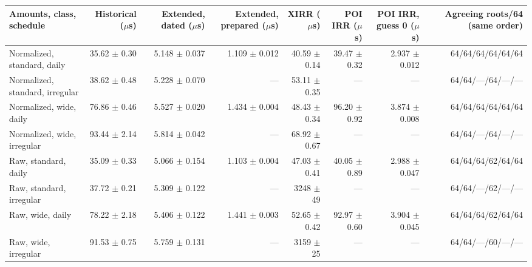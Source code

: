 \begin{tabular}{lrrrrrrr}
\toprule
Amounts, class, schedule & Historical ($\mu$s) & Extended, dated ($\mu$s) & Extended, prepared ($\mu$s) & XIRR ($\mu$s) & POI IRR ($\mu$s) & POI IRR, guess 0 ($\mu$s) & Agreeing roots/64 (same order) \\
\midrule
Normalized, standard, daily & 35.62 $\pm$ 0.30 & 5.148 $\pm$ 0.037 & 1.109 $\pm$ 0.012 & 40.59 $\pm$ 0.14 & 39.47 $\pm$ 0.32 & 2.937 $\pm$ 0.012 & 64/64/64/64/64/64 \\
Normalized, standard, irregular & 38.62 $\pm$ 0.48 & 5.228 $\pm$ 0.070 & --- & 53.11 $\pm$ 0.35 & --- & --- & 64/64/---/64/---/--- \\
Normalized, wide, daily & 76.86 $\pm$ 0.46 & 5.527 $\pm$ 0.020 & 1.434 $\pm$ 0.004 & 48.43 $\pm$ 0.34 & 96.20 $\pm$ 0.92 & 3.874 $\pm$ 0.008 & 64/64/64/64/64/64 \\
Normalized, wide, irregular & 93.44 $\pm$ 2.14 & 5.814 $\pm$ 0.042 & --- & 68.92 $\pm$ 0.67 & --- & --- & 64/64/---/64/---/--- \\
Raw, standard, daily & 35.09 $\pm$ 0.33 & 5.066 $\pm$ 0.154 & 1.103 $\pm$ 0.004 & 47.03 $\pm$ 0.41 & 40.05 $\pm$ 0.89 & 2.988 $\pm$ 0.047 & 64/64/64/62/64/64 \\
Raw, standard, irregular & 37.72 $\pm$ 0.21 & 5.309 $\pm$ 0.122 & --- & 3248 $\pm$ 49 & --- & --- & 64/64/---/62/---/--- \\
Raw, wide, daily & 78.22 $\pm$ 2.18 & 5.406 $\pm$ 0.122 & 1.441 $\pm$ 0.003 & 52.65 $\pm$ 0.42 & 92.97 $\pm$ 0.60 & 3.904 $\pm$ 0.045 & 64/64/64/62/64/64 \\
Raw, wide, irregular & 91.53 $\pm$ 0.75 & 5.759 $\pm$ 0.131 & --- & 3159 $\pm$ 25 & --- & --- & 64/64/---/60/---/--- \\
\bottomrule
\end{tabular}
